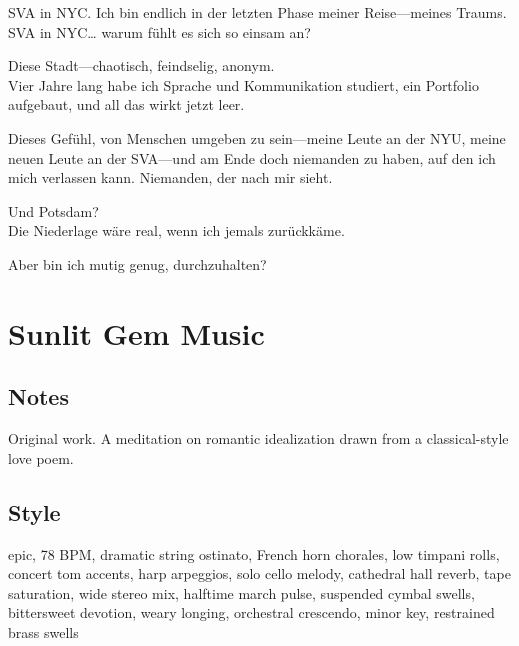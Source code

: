 \begin{lyrics}
SVA in NYC. Ich bin endlich in der letzten Phase meiner Reise—meines Traums.\\
SVA in NYC… warum fühlt es sich so einsam an?

Diese Stadt—chaotisch, feindselig, anonym.\\
Vier Jahre lang habe ich Sprache und Kommunikation studiert, ein Portfolio aufgebaut, und all das wirkt jetzt leer.

Dieses Gefühl, von Menschen umgeben zu sein—meine Leute an der NYU, meine neuen Leute an der SVA—und am Ende doch niemanden zu haben, auf den ich mich verlassen kann. Niemanden, der nach mir sieht.

Und Potsdam?\\
Die Niederlage wäre real, wenn ich jemals zurückkäme.

Aber bin ich mutig genug, durchzuhalten?

\end{lyrics}

\section{Sunlit Gem Music}

\subsection{Notes}
Original work.
A meditation on romantic idealization drawn from a classical-style love poem.

\subsection{Style}
epic, 78 BPM, dramatic string ostinato, French horn chorales, low timpani rolls, concert tom accents, harp arpeggios, solo cello melody, cathedral hall reverb, tape saturation, wide stereo mix, halftime march pulse, suspended cymbal swells, bittersweet devotion, weary longing, orchestral crescendo, minor key, restrained brass swells

